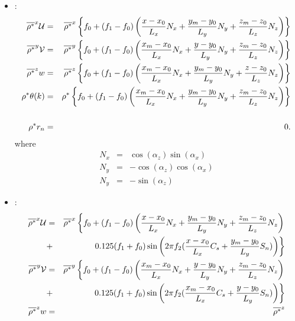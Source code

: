 \begin{itemize}
\item {} :
\begin{eqnarray}
\overline{\rho^{*}}^{x} {\cal U} & = & \overline{\rho^{*}}^{x}
\left\{ f_{0} + (f_{1}- f_{0}) \left( \dfrac{x-x_{0}}{L_{x}} N_{x}
+ \dfrac{y_{m}-y_{0}}{L_{y}} N_{y} + \dfrac{z_{m}-z_{0}}{L_{z}} N_{z} \right)\right\}\\
\overline{\rho^{*}}^{y}{\cal V} & = &    \overline{\rho^{*}}^{y}
\left\{ f_{0} + (f_{1}- f_{0}) \left( \dfrac{x_{m}-x_{0}}{L_{x}} N_{x}
+ \dfrac{y-y_{0}}{L_{y}} N_{y} + \dfrac{z_{m}-z_{0}}{L_{z}} N_{z}\right)\right\} \\
\overline{ \rho^{*}}^{z} w & = &  \overline{\rho^{*}}^{z}
\left\{ f_{0} + (f_{1}- f_{0}) \left( \dfrac{x_{m}-x_{0}}{L_{x}} N_{x}
+ \dfrac{y_{m}-y_{0}}{L_{y}} N_{y} + \dfrac{z-z_{0}}{L_{z}} N_{z}\right)\right\} \\
\rho^{*} \theta(k) & = &   \rho^{*}
\left\{ f_{0} + (f_{1}- f_{0}) \left( \dfrac{x_{m}-x_{0}}{L_{x}} N_{x}
+ \dfrac{y_{m}-y_{0}}{L_{y}} N_{y} + \dfrac{z_{m}-z_{0}}{L_{z}} N_{z} \right)\right\}\\
\\
\rho^{*} r_{n} & = & 0.
\end{eqnarray}
where
\begin{eqnarray}
N_{x} & = & \cos(\alpha_{z})\sin(\alpha_{x}) \\
N_{y} & = & - \cos(\alpha_{z})\cos(\alpha_{x}) \\
N_{y} & = & - \sin(\alpha_{z})
\end{eqnarray}
\item {} :
\begin{eqnarray}
\overline{\rho^{*}}^{x} {\cal U} & = & \overline{\rho^{*}}^{x}
\left\{ f_{0} + (f_{1}- f_{0}) \left( \dfrac{x-x_{0}}{L_{x}} N_{x}
+ \dfrac{y_{m}-y_{0}}{L_{y}} N_{y} + \dfrac{z_{m}-z_{0}}{L_{z}} N_{z}
\right) \right. \\
& + & \left. 0.125 (f_{1}+ f_{0}) \sin \left(2 \pi f_{2} (\dfrac{x-x_{0}}{L_{x}} C_{s}
+ \dfrac{y_{m}-y_{0}}{L_{y}} S_{n}) \right) \right\}
 \\
\overline{\rho^{*}}^{y}{\cal V} & = &    \overline{\rho^{*}}^{y}
\left\{ f_{0} + (f_{1}- f_{0}) \left( \dfrac{x_{m}-x_{0}}{L_{x}} N_{x}
+ \dfrac{y-y_{0}}{L_{y}} N_{y} + \dfrac{z_{m}-z_{0}}{L_{z}} N_{z} \right)\right.
\\ & + & \left.0.125 (f_{1}+ f_{0}) \sin \left( 2 \pi f_{2}( \dfrac{x_{m}-x_{0}}{L_{x}} C_{s}
+ \dfrac{y-y_{0}}{L_{y}} S_{n} ) \right) \right\}\\
\overline{ \rho^{*}}^{z} w & = &  \overline{\rho^{*}}^{z}

\end{eqnarray}
\end{itemize}
